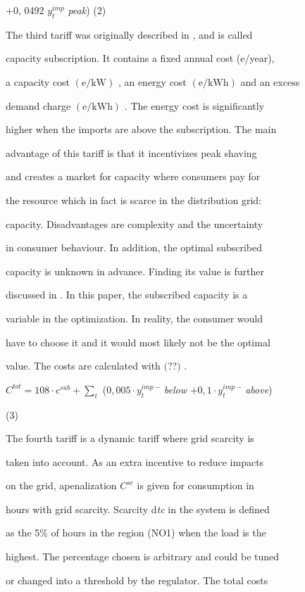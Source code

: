 \documentclass[a4paper,12pt]{article}
\begin{document}
$+0$, 0492 $y_{t}^{imp}$ {\it peak}) (2)

The third tariff was originally described in , and is called

capacity subscription. It contains a fixed annual cost (e/year),

a capacity cost $(\mathrm{e}/\mathrm{k}\mathrm{W})$ , an energy cost $(\mathrm{e}/\mathrm{k}\mathrm{W}\mathrm{h})$ and an excess

demand charge $(\mathrm{e}/\mathrm{k}\mathrm{W}\mathrm{h})$ . The energy cost is significantly

higher when the imports are above the subscription. The main

advantage of this tariff is that it incentivizes peak shaving

and creates a market for capacity where consumers pay for

the resource which in fact is scarce in the distribution grid:

capacity. Disadvantages are complexity and the uncertainty

in consumer behaviour. In addition, the optimal subscribed

capacity is unknown in advance. Finding its value is further

discussed in . In this paper, the subscribed capacity is a

variable in the optimization. In reality, the consumer would

have to choose it and it would most likely not be the optimal

value. The costs are calculated with $($??$)$ .

$C^{tot} = 108\displaystyle \cdot c^{sub}+\sum_{t}$ ($0,005\cdot y_{t}^{imp-\ }${\it below} $+0, 1\cdot y_{t}^{imp-\ }${\it above})

(3)

The fourth tariff is a dynamic tariff where grid scarcity is

taken into account. As an extra incentive to reduce impacts

on the grid, apenalization $C^{sc}$ is given for consumption in

hours with grid scarcity. Scarcity d{\it tc} in the system is defined

as the 5\% of hours in the region (NO1) when the load is the

highest. The percentage chosen is arbitrary and could be tuned

or changed into a threshold by the regulator. The total costs
\end{document}
